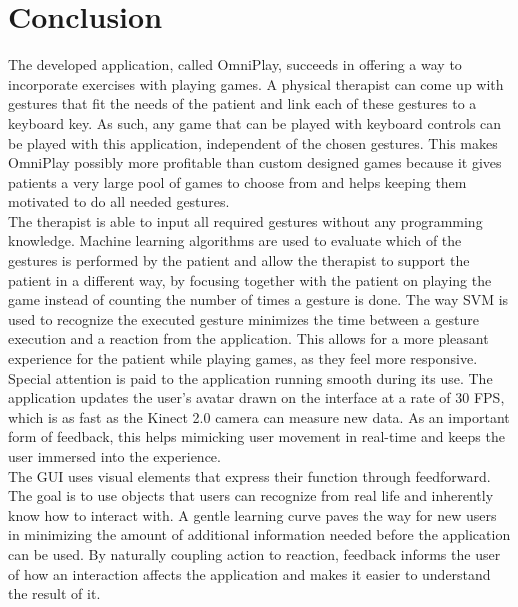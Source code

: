 \chapter{Conclusion}

The developed application, called OmniPlay, succeeds in offering a way to incorporate exercises with playing games. A physical therapist can come up with gestures that fit the needs of the patient and link each of these gestures to a keyboard key. As such, any game that can be played with keyboard controls can be played with this application, independent of the chosen gestures. This makes OmniPlay possibly more profitable than custom designed games because it gives patients a very large pool of games to choose from and helps keeping them motivated to do all needed gestures.\\

The therapist is able to input all required gestures without any programming knowledge. Machine learning algorithms are used to evaluate which of the gestures is performed by the patient and allow the therapist to support the patient in a different way, by focusing together with the patient on playing the game instead of counting the number of times a gesture is done. The way SVM is used to recognize the executed gesture minimizes the time between a gesture execution and a reaction from the application. This allows for a more pleasant experience for the patient while playing games, as they feel more responsive.\\

Special attention is paid to the application running smooth during its use. The application updates the user's avatar drawn on the interface at a rate of 30 FPS, which is as fast as the Kinect 2.0 camera can measure new data. As an important form of feedback, this helps mimicking user movement in real-time and keeps the user immersed into the experience.\\

The GUI uses visual elements that express their function through feedforward. The goal is to use objects that users can recognize from real life and inherently know how to interact with. A gentle learning curve paves the way for new users in minimizing the amount of additional information needed before the application can be used. By naturally coupling action to reaction, feedback informs the user of how an interaction affects the application and makes it easier to understand the result of it.\\

